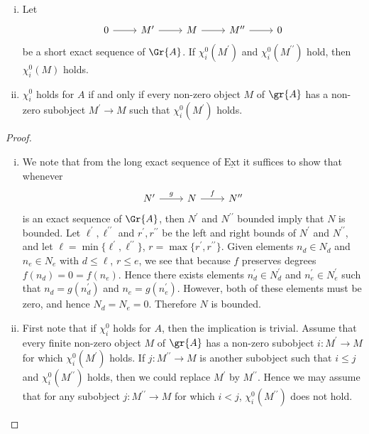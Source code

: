 \documentclass[10pt]{amsart}
\begin{document}
\begin{prop}
  \begin{prop}
    \begin{enumerate}[(i)]
    \item
      Let
      $$\begin{tikzcd}
        0 \arrow{r} & M^\prime \arrow{r} & M \arrow{r} & M^{\prime\prime} \arrow{r} & 0
      \end{tikzcd}$$
      be a short exact sequence of $\Gr{A}$.
      If $\chi^0_i(M^\prime)$ and $\chi^0_i(M^{\prime\prime})$ hold, then $\chi^0_i(M)$ holds.
    \item
      $\chi^0_i$ holds for $A$ if and only if every non-zero object $M$ of $\gr{A}$ has a non-zero subobject $M^\prime \rightarrow M$ such that $\chi^0_i(M^\prime)$ holds.
    \end{enumerate}
    \begin{proof}
      \begin{enumerate}[(i)]
      \item
        We note that from the long exact sequence of $\operatorname{\underline{Ext}}$ it suffices to show that whenever
        $$\begin{tikzcd}
          N^\prime \arrow{r}{g} & N \arrow{r}{f} & N^{\prime\prime}
        \end{tikzcd}$$
        is an exact sequence of $\Gr{A}$, then $N^\prime$ and $N^{\prime\prime}$ bounded imply that $N$ is bounded.
        Let $\ell^\prime, \ell^{\prime\prime}$ and $r^\prime, r^{\prime\prime}$ be the left and right bounds of $N^\prime$ and $N^{\prime\prime}$, and let $\ell = \min\{\ell^\prime, \ell^{\prime\prime}\}$, $r = \max\{r^\prime, r^{\prime\prime}\}$.
        Given elements $n_d \in N_d$ and $n_e \in N_e$ with $d \leq \ell$, $r \leq e$, we see that because $f$ preserves degrees $f(n_d) = 0 = f(n_e)$.
        Hence there exists elements $n^\prime_d \in N^\prime_d$ and $n^\prime_e \in N^\prime_e$ such that $n_d = g(n^\prime_d)$ and $n_e = g(n^\prime_e)$.
        However, both of these elements must be zero, and hence $N_d = N_e = 0$.
        Therefore $N$ is bounded.
      \item
        First note that if $\chi^0_i$ holds for $A$, then the implication is trivial.
        Assume that every finite non-zero object $M$ of $\gr{A}$ has a non-zero subobject $i \colon M^\prime \rightarrow M$ for which $\chi^0_i(M^\prime)$ holds.
        If $j \colon M^{\prime\prime} \rightarrow M$ is another subobject such that $i \leq j$ and  $\chi^0_i(M^{\prime\prime})$ holds, then we could replace $M^\prime$ by $M^{\prime\prime}$.
        Hence we may assume that for any subobject $j \colon M^{\prime\prime} \rightarrow M$ for which $i < j$, $\chi^0_i(M^{\prime\prime})$ does not hold.
        

\end{enumerate}
\end{proof}
\end{prop}
\end{prop}
\end{document}
